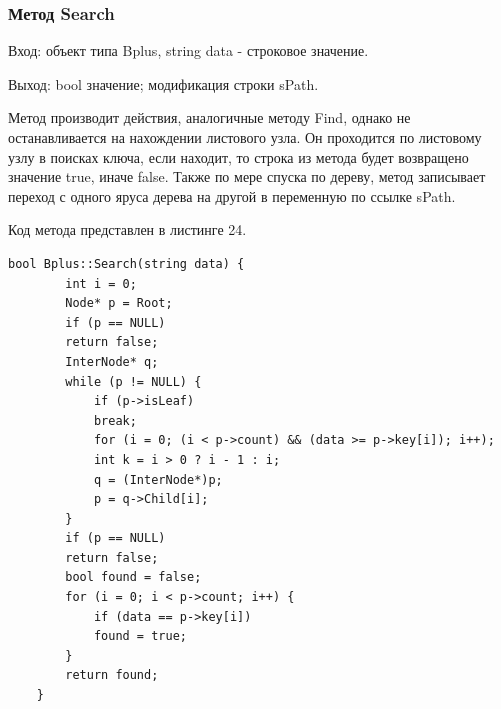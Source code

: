 \documentclass[11pt,a4paper,final]{article} %
\begin{document}
\subsubsection{Метод Search}
Вход: объект типа Bplus, string data - строковое значение. \par
Выход: bool значение; модификация строки sPath. \par
Метод производит действия, аналогичные методу Find, однако не останавливается на нахождении листового узла. Он проходится по листовому узлу в поисках ключа, если находит, то строка из метода будет возвращено значение true, иначе false. Также по мере спуска по дереву, метод записывает переход с одного яруса дерева на другой в переменную по ссылке sPath. \par
Код метода представлен в листинге 24.
\begin{lstlisting}[label=Search, caption = Метод Search]
	bool Bplus::Search(string data) {
		int i = 0;
		Node* p = Root;
		if (p == NULL)
		return false;
		InterNode* q;
		while (p != NULL) {
			if (p->isLeaf)
			break;
			for (i = 0; (i < p->count) && (data >= p->key[i]); i++);
			int k = i > 0 ? i - 1 : i;
			q = (InterNode*)p;
			p = q->Child[i];
		}
		if (p == NULL)
		return false;
		bool found = false;
		for (i = 0; i < p->count; i++) {
			if (data == p->key[i])
			found = true;
		}
		return found;
	}
\end{lstlisting}
\end{document}
